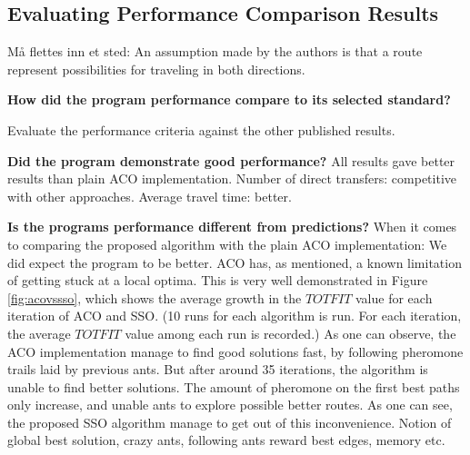 \subsection{Evaluating Performance Comparison Results}

Må flettes inn et sted: An assumption made by the authors is that a route represent possibilities for traveling in both directions.

\textbf{How did the program performance compare to its selected standard?} 



Evaluate the performance criteria against the other published results. 

\textbf{Did the program demonstrate good performance?}
All results gave better results than plain ACO implementation.
Number of direct transfers: competitive with other approaches. Average travel time: better. 

\textbf{Is the programs performance different from predictions?} When it comes to comparing the proposed algorithm with the plain ACO implementation: We did expect the program to be better. ACO has, as mentioned, a known limitation of getting stuck at a local optima. This is very well demonstrated in Figure \ref{fig:acovssso}, which shows the average growth in the $TOTFIT$ value for each iteration of ACO and SSO. (10 runs for each algorithm is run. For each iteration, the average $TOTFIT$ value among each run is recorded.) As one can observe, the ACO implementation manage to find good solutions fast, by following pheromone trails laid by previous ants. But after around 35 iterations, the algorithm is unable to find better solutions. The amount of pheromone on the first best paths only increase, and unable ants to explore possible better routes. As one can see, the proposed SSO algorithm manage to get out of this inconvenience. Notion of global best solution, crazy ants, following ants reward best edges, memory etc.



